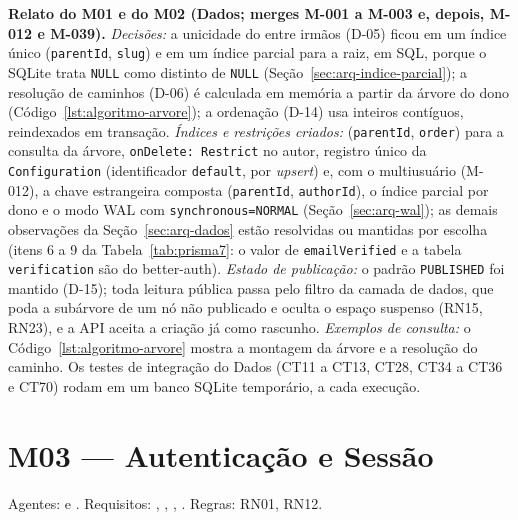 \textbf{Relato do M01 e do M02 (Dados; merges M-001 a M-003 e, depois, M-012 e M-039).} \emph{Decisões:} a unicidade do  entre irmãos (D-05) ficou em um índice único (\texttt{parentId}, \texttt{slug}) e em um índice parcial para a raiz, em SQL, porque o SQLite trata \texttt{NULL} como distinto de \texttt{NULL} (Seção~\ref{sec:arq-indice-parcial}); a resolução de caminhos (D-06) é calculada em memória a partir da árvore do dono (Código~\ref{lst:algoritmo-arvore}); a ordenação (D-14) usa inteiros contíguos, reindexados em transação. \emph{Índices e restrições criados:} (\texttt{parentId}, \texttt{order}) para a consulta da árvore, \texttt{onDelete: Restrict} no autor, registro único da \texttt{Configuration} (identificador \texttt{default}, por \emph{upsert}) e, com o multiusuário (M-012), a chave estrangeira composta (\texttt{parentId}, \texttt{authorId}), o índice parcial por dono e o modo WAL com \texttt{synchronous=NORMAL} (Seção~\ref{sec:arq-wal}); as demais observações da Seção~\ref{sec:arq-dados} estão resolvidas ou mantidas por escolha (itens 6 a 9 da Tabela~\ref{tab:prisma7}: o valor de \texttt{emailVerified} e a tabela \texttt{verification} são do better-auth). \emph{Estado de publicação:} o padrão \texttt{PUBLISHED} foi mantido (D-15); toda leitura pública passa pelo filtro da camada de dados, que poda a subárvore de um nó não publicado e oculta o espaço suspenso (RN15, RN23), e a API aceita a criação já como rascunho. \emph{Exemplos de consulta:} o Código~\ref{lst:algoritmo-arvore} mostra a montagem da árvore e a resolução do caminho. Os testes de integração do Dados (CT11 a CT13, CT28, CT34 a CT36 e CT70) rodam em um banco SQLite temporário, a cada execução.

\section{M03 --- Autenticação e Sessão}\label{sec:impl-auth}

\noindent{}\quad Agentes:  e . Requisitos: , , , . Regras: RN01, RN12.

